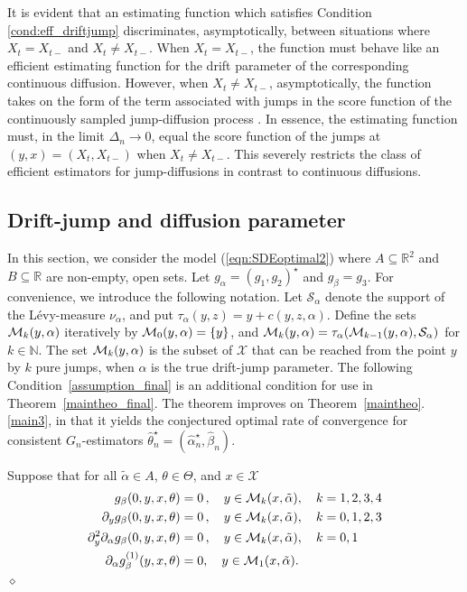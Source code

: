 \documentclass[11pt,a4paper]{article}
\newcommand{\RR}{{\mathbb R}}
\newcommand{\NN}{{\mathbb N}}
\renewcommand{\ss}{{\mathcal{S}}}
\newcommand{\xx}{{\mathcal{X}}}
\newcommand{\dqed}{{\leavevmode \unskip \penalty9999 \hbox{} \nobreak \hfill \quad \hbox{$\diamond$}}}
\numberwithin{equation}{section}
\numberwithin{theorem}{section}
\begin{document}
It is evident that an estimating function which satisfies Condition
\ref{cond:eff_driftjump} discriminates, asymptotically, between
situations where $X_t = X_{t-}$ and $X_t \neq X_{t-}$. When $X_t =
X_{t-}$, the function must behave like an efficient estimating function for the
drift parameter of the corresponding continuous diffusion. However, when $X_t \neq X_{t-}$, asymptotically, the function takes
on the form of the term associated with jumps in the score function of the
continuously sampled jump-diffusion process \cite{soerensen1991}.
In essence, the estimating function must, in the limit
$\Delta_n\to 0$, equal the  score function of the jumps at $(y,x)=(X_t,X_{t-})$ when $X_t \neq X_{t-}$. This  severely restricts the class of efficient estimators for
jump-diffusions in contrast to continuous diffusions.

\subsection{Drift-jump and diffusion parameter}\label{onedimdiff}
%
In this section, we consider the model (\ref{eqn:SDEoptimal2}) where $A \subseteq \RR^2$ and $B
\subseteq \RR$ are non-empty, open sets. Let  $g_\alpha = (g_1, g_2)^\star $ and $g_\beta = g_3$. For convenience, we introduce the following notation. Let $\ss_\alpha$ denote the support of the L\'evy-measure $\nu_\alpha$, and put $\tau_\alpha(y,z) = y + c(y,z,\alpha)$. Define the sets ${\cal M}_k(y,\alpha)$ iteratively by ${\cal M}_0(y,\alpha) = \{ y \}$, and ${\cal  M}_k(y,\alpha) = \tau_\alpha({\cal M}_{k-1} (y,\alpha), \ss_\alpha)$ for $k\in \NN$. The set ${\cal M}_k(y,\alpha)$ is the subset of $\xx$ that can be reached from the point $y$ by $k$ pure jumps, when $\alpha$ is the true drift-jump parameter.
%
The following Condition~\ref{assumption_final} is an additional condition for use in Theorem~\ref{maintheo_final}. The theorem improves on Theorem~\ref{maintheo}.\ref{main3}, in that it yields the conjectured optimal rate of convergence for consistent $G_n$-estimators $\hat{\theta}_n^\star = (\hat{\alpha}_n^\star,\hat{\beta}_n)$.
\begin{condition}
Suppose that for all $\tilde{\alpha} \in A$, $\theta \in \Theta$, and $x \in \xx$
\begin{align*} 
g_\beta(0,y,x, \theta) &= 0\,,\quad y \in {\cal M}_k(x,\tilde \alpha), \quad k=1,2,3,4\\
\partial_y g_\beta(0, y,x, \theta) &= 0\,,\quad y \in {\cal M}_k(x,\tilde \alpha), \quad k=0,1,2,3 \\
\partial^2_y \partial_\alpha g_\beta(0, y, x, \theta)&=0\,,\quad y \in {\cal M}_k(x,\tilde \alpha), \quad k=0,1\\
\partial_\alpha g_\beta^{(1)}(y,x, \theta) &=0, \quad y \in {\cal M}_1(x,\tilde \alpha).
\end{align*}
\dqed
\label{assumption_final}
\end{condition}
\end{document}
